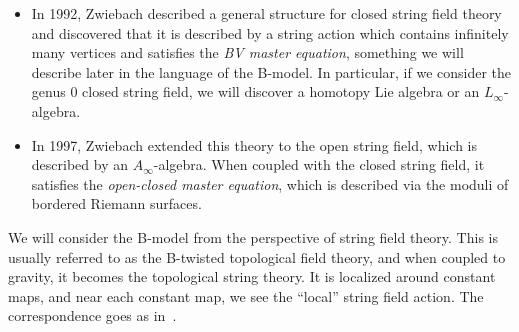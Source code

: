 \documentclass[article,10pt,oneside,oldfontcommands]{memoir}
\theoremstyle{definition}
\theoremstyle{remark}
\theoremstyle{plain}
\theoremstyle{definition}
\theoremstyle{remark}
\newcommand{\1}{\mathbf{1}}
\newcommand{\2}{\mathbf{2}}
\newcommand{\3}{\mathbf{3}}
\begin{document}
\begin{itemize}
    \item In 1992, Zwiebach described a general structure for closed string field theory and discovered that it is described by a string action which contains infinitely many vertices and satisfies the \textit{BV master equation}, something we will describe later in the language of the B-model. In particular, if we consider the genus \(0\) closed string field, we will discover a homotopy Lie algebra or an \(L_{\infty}\)-algebra.
    \item In 1997, Zwiebach extended this theory to the open string field, which is described by an \(A_{\infty}\)-algebra. When coupled with the closed string field, it satisfies the \textit{open-closed master equation}, which is described via the moduli of bordered Riemann surfaces.
\end{itemize}



We will consider the B-model from the perspective of string field theory. This is usually referred to as the B-twisted topological field theory, and when coupled to gravity, it becomes the topological string theory. It is localized around constant maps, and near each constant map, we see the ``local'' string field action. The correspondence goes as in~.
\end{document}
